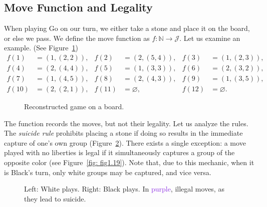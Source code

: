 \subsection{Move Function and Legality}\label{criterio_jugada}
When playing Go on our turn, we either take a stone and place it on the board, or else we pass. We define the move function as $f: \mathbb{N} \to \mathcal{J}$. Let us examine an example. (See Figure~\ref{fig_ej_mov})
\begin{align*}
f(1) &= (1,(2,2)), & f(2) &= (2,(5,4)), & f(3) &= (1,(2,3)),\\
f(4) &= (2,(4,4)), & f(5) &= (1,(3,3)), & f(6) &= (2,(3,2)),\\
f(7) &= (1,(4,5)), & f(8) &= (2,(4,3)), & f(9) &= (1,(3,5)),\\
f(10) &= (2,(2,1)), & f(11) &= \varnothing, & f(12) &= \varnothing.
\end{align*}
\begin{figure}[H]
	\centering
\begin{goban}[7, hoshi = false]
\end{goban}
\caption{Reconstructed game on a board.}
\label{fig_ej_mov}
\end{figure}
The function records the moves, but not their legality. Let us analyze the rules. The \textit{suicide rule} prohibits placing a stone if doing so results in the immediate capture of one's own group (Figure~\ref{sui_ej}). There exists a single exception: a move played with no liberties is legal if it simultaneously captures a group of the opposite color (see Figure~\ref{fig: fig1.19}). Note that, due to this mechanic, when it is Black's turn, only white groups may be captured, and vice versa.
\begin{figure}[H]
	\centering
\begin{goban}[7]
\end{goban}
\quad
\begin{goban}[7]
\end{goban}
	\caption{Left: White plays. Right: Black plays. In \textcolor{BlueViolet}{purple}, illegal moves, as they lead to suicide.}
	\label{sui_ej}
\end{figure}

